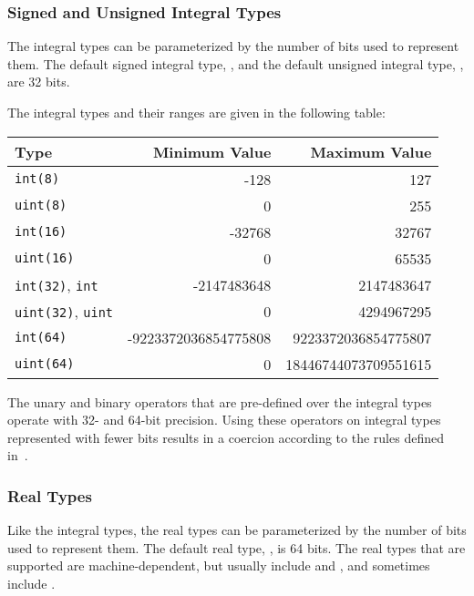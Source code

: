 \subsubsection{Signed and Unsigned Integral Types}
\label{Signed_and_Unsigned_Integral_Types}

The integral types can be parameterized by the number of bits used to
represent them.  The default signed integral type, , and the
default unsigned integral type, , are 32 bits.

The integral types and their ranges are given in the following table:

\begin{center}
\begin{tabular}{|l|r|r|}
\hline
{\bf Type} & {\bf Minimum Value} & {\bf Maximum Value} \\
\hline
{\tt int(8)} & -128 & 127 \\
{\tt uint(8)} & 0 & 255 \\
{\tt int(16)} & -32768 & 32767 \\
{\tt uint(16)} & 0 & 65535 \\
{\tt int(32)}, {\tt int} & -2147483648 & 2147483647 \\
{\tt uint(32)}, {\tt uint} & 0 & 4294967295 \\
{\tt int(64)} & -9223372036854775808 & 9223372036854775807 \\
{\tt uint(64)} & 0 & 18446744073709551615 \\
\hline
\end{tabular}
\end{center}

The unary and binary operators that are pre-defined over the integral
types operate with 32- and 64-bit precision.  Using these operators on
integral types represented with fewer bits results in a coercion
according to the rules defined in~.

\subsubsection{Real Types}
\label{Real_Types}

Like the integral types, the real types can be parameterized by the
number of bits used to represent them.  The default real
type, , is 64 bits.  The real types that are supported are
machine-dependent, but usually include 
and , and sometimes include .

